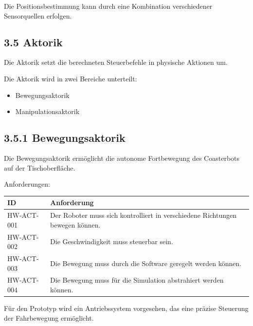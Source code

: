 \documentclass[
]{article}
\providecommand{\tightlist}{%
  \setlength{\itemsep}{0pt}\setlength{\parskip}{0pt}}
\begin{document}
Die Positionsbestimmung kann durch eine Kombination verschiedener
Sensorquellen erfolgen.

\subsection{3.5 Aktorik}\label{aktorik}

Die Aktorik setzt die berechneten Steuerbefehle in physische Aktionen
um.

Die Aktorik wird in zwei Bereiche unterteilt:

\begin{itemize}
\tightlist
\item
  Bewegungsaktorik
\item
  Manipulationsaktorik
\end{itemize}

\subsection{3.5.1 Bewegungsaktorik}\label{bewegungsaktorik}

Die Bewegungsaktorik ermöglicht die autonome Fortbewegung des
Coasterbots auf der Tischoberfläche.

Anforderungen:

\begin{longtable}[]{@{}
  >{\raggedright\arraybackslash}p{}
  >{\raggedright\arraybackslash}p{}@{}}
\toprule\noalign{}
\begin{minipage}[b]{\linewidth}\raggedright
ID
\end{minipage} & \begin{minipage}[b]{\linewidth}\raggedright
Anforderung
\end{minipage} \\
\midrule\noalign{}
\endhead
\bottomrule\noalign{}
\endlastfoot
HW-ACT-001 & Der Roboter muss sich kontrolliert in verschiedene
Richtungen bewegen können. \\
HW-ACT-002 & Die Geschwindigkeit muss steuerbar sein. \\
HW-ACT-003 & Die Bewegung muss durch die Software geregelt werden
können. \\
HW-ACT-004 & Die Bewegung muss für die Simulation abstrahiert werden
können. \\
\end{longtable}

Für den Prototyp wird ein Antriebssystem vorgesehen, das eine präzise
Steuerung der Fahrbewegung ermöglicht.
\end{document}
